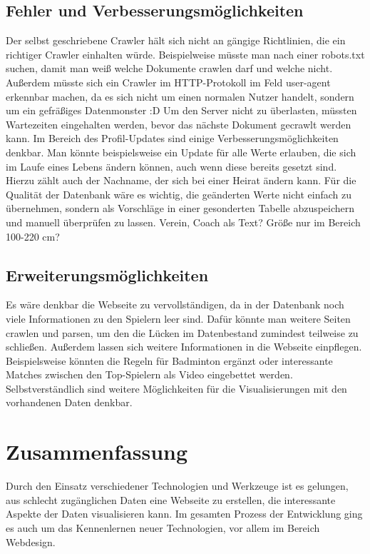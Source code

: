 \documentclass[12pt,a4paper]{article}
\begin{document}
\subsection{Fehler und Verbesserungsmöglichkeiten}
Der selbst geschriebene Crawler hält sich nicht an gängige Richtlinien, die ein \glqq richtiger\grqq{} Crawler einhalten würde. Beispielweise müsste man nach einer \glqq robots.txt\grqq{} suchen, damit man weiß welche Dokumente crawlen darf und welche nicht. Außerdem müsste sich ein Crawler im HTTP-Protokoll im Feld \glqq user-agent\grqq{} erkennbar machen, da es sich nicht um einen normalen Nutzer handelt, sondern um ein gefräßiges Datenmonster :D Um den Server nicht zu überlasten, müssten Wartezeiten eingehalten werden, bevor das nächste Dokument gecrawlt werden kann.
\newline\newline
Im Bereich des Profil-Updates sind einige Verbesserungsmöglichkeiten denkbar. Man könnte beispielsweise ein Update für alle Werte erlauben, die sich im Laufe eines Lebens ändern können, auch wenn diese bereits gesetzt sind. Hierzu zählt auch der Nachname, der sich bei einer Heirat ändern kann. Für die Qualität der Datenbank wäre es wichtig, die geänderten Werte nicht einfach zu übernehmen, sondern als Vorschläge in einer gesonderten Tabelle abzuspeichern und manuell überprüfen zu lassen.
\newline\newline
Verein, Coach als Text? Größe nur im Bereich 100-220 cm?

\subsection{Erweiterungsmöglichkeiten}
Es wäre denkbar die Webseite zu \glqq vervollständigen\grqq, da in der Datenbank noch viele Informationen zu den Spielern leer sind. Dafür könnte man weitere Seiten crawlen und parsen, um den die Lücken im Datenbestand zumindest teilweise zu schließen. Außerdem lassen sich weitere Informationen in die Webseite einpflegen. Beispielsweise könnten die Regeln für Badminton ergänzt oder interessante Matches zwischen den Top-Spielern als Video eingebettet werden. Selbstverständlich sind weitere Möglichkeiten für die Visualisierungen mit den vorhandenen Daten denkbar.

\section{Zusammenfassung}
Durch den Einsatz verschiedener Technologien und Werkzeuge ist es gelungen, aus schlecht zugänglichen Daten eine Webseite zu erstellen, die interessante Aspekte der Daten visualisieren kann. Im gesamten Prozess der Entwicklung ging es auch um das Kennenlernen neuer Technologien, vor allem im Bereich Webdesign.

\newpage

\printbibliography	
\newpage

\newpage
\end{document}

